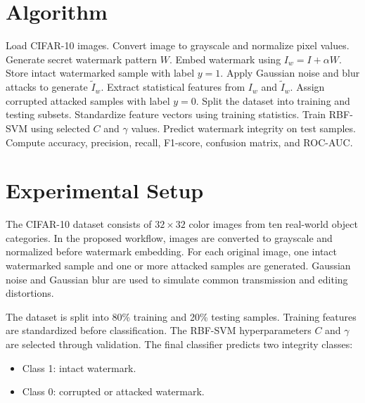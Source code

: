 \documentclass[conference]{IEEEtran}
\begin{document}
\section{Algorithm}
\begin{algorithm}[t]
\caption{Predictive Watermark Integrity Detection}
\label{alg:watermark_svm}
\begin{algorithmic}[1]
\State Load CIFAR-10 images.
    \State Convert image to grayscale and normalize pixel values.
    \State Generate secret watermark pattern $W$.
    \State Embed watermark using $I_w = I + \alpha W$.
    \State Store intact watermarked sample with label $y=1$.
    \State Apply Gaussian noise and blur attacks to generate $\tilde{I}_w$.
    \State Extract statistical features from $I_w$ and $\tilde{I}_w$.
    \State Assign corrupted attacked samples with label $y=0$.
\EndFor
\State Split the dataset into training and testing subsets.
\State Standardize feature vectors using training statistics.
\State Train RBF-SVM using selected $C$ and $\gamma$ values.
\State Predict watermark integrity on test samples.
\State Compute accuracy, precision, recall, F1-score, confusion matrix, and ROC-AUC.
\end{algorithmic}
\end{algorithm}

\section{Experimental Setup}
The CIFAR-10 dataset consists of $32 \times 32$ color images from ten real-world object categories. In the proposed workflow, images are converted to grayscale and normalized before watermark embedding. For each original image, one intact watermarked sample and one or more attacked samples are generated. Gaussian noise and Gaussian blur are used to simulate common transmission and editing distortions.

The dataset is split into 80\% training and 20\% testing samples. Training features are standardized before classification. The RBF-SVM hyperparameters $C$ and $\gamma$ are selected through validation. The final classifier predicts two integrity classes:
\begin{itemize}
    \item Class 1: intact watermark.
    \item Class 0: corrupted or attacked watermark.
\end{itemize}
\end{document}
